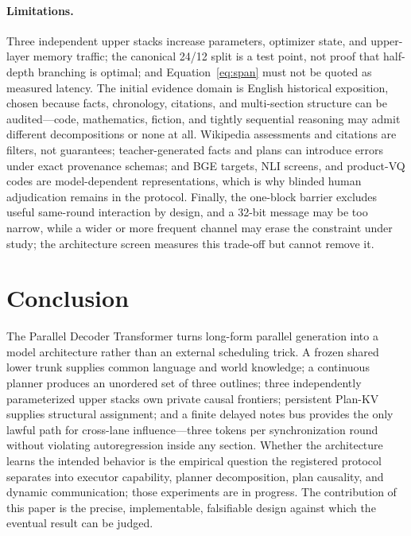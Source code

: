 \documentclass[10pt]{article}
\begin{document}
\paragraph{Limitations.}
Three independent upper stacks increase parameters, optimizer state, and
upper-layer memory traffic; the canonical 24/12 split is a test point, not
proof that half-depth branching is optimal; and Equation~\ref{eq:span} must
not be quoted as measured latency. The initial evidence domain is English
historical exposition, chosen because facts, chronology, citations, and
multi-section structure can be audited---code, mathematics, fiction, and
tightly sequential reasoning may admit different decompositions or none at
all. Wikipedia assessments and citations are filters, not guarantees;
teacher-generated facts and plans can introduce errors under exact
provenance schemas; and BGE targets, NLI screens, and product-VQ codes are
model-dependent representations, which is why blinded human adjudication
remains in the protocol. Finally, the one-block barrier excludes useful
same-round interaction by design, and a 32-bit message may be too narrow,
while a wider or more frequent channel may erase the constraint under study;
the architecture screen measures this trade-off but cannot remove it.

\section{Conclusion}
\label{sec:conclusion}

The Parallel Decoder Transformer turns long-form parallel generation into a
model architecture rather than an external scheduling trick. A frozen shared
lower trunk supplies common language and world knowledge; a continuous
planner produces an unordered set of three outlines; three independently
parameterized upper stacks own private causal frontiers; persistent Plan-KV
supplies structural assignment; and a finite delayed notes bus provides the
only lawful path for cross-lane influence---three tokens per synchronization
round without violating autoregression inside any section. Whether the
architecture learns the intended behavior is the empirical question the
registered protocol separates into executor capability, planner
decomposition, plan causality, and dynamic communication; those experiments
are in progress. The contribution of this paper is the precise,
implementable, falsifiable design against which the eventual result can be
judged.

\appendix
\end{document}
